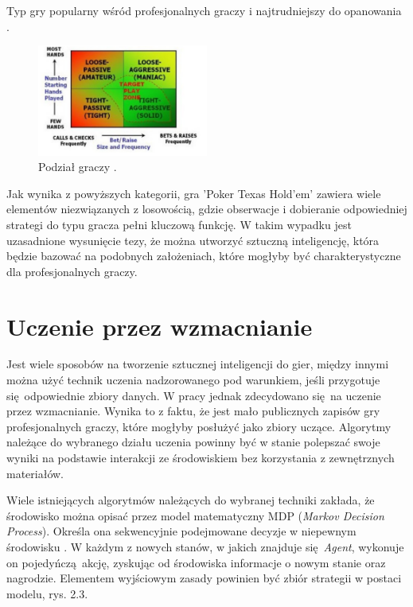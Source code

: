 \documentclass[12pt,oneside,a4paper]{report}
\begin{document}
Typ gry popularny wśród profesjonalnych graczy i najtrudniejszy do opanowania \cite{class}.




\begin{figure}[h!]
            \center
           \includegraphics[width=0.5\textwidth]{./img/class.pdf}
           \caption{Podział graczy \cite{class}.}
\end{figure}


Jak wynika z powyższych kategorii, gra 'Poker Texas Hold'em' zawiera wiele elementów niezwiązanych z
losowością, gdzie obserwacje i dobieranie odpowiedniej strategi do typu gracza pełni kluczową
funkcję. W takim
wypadku jest uzasadnione wysunięcie tezy, że można utworzyć sztuczną inteligencję,
która będzie bazować na podobnych założeniach, które mogłyby być charakterystyczne
dla profesjonalnych graczy.

\section{Uczenie przez wzmacnianie}

Jest wiele sposobów na tworzenie sztucznej inteligencji do gier, między innymi można użyć technik uczenia
nadzorowanego pod warunkiem, jeśli przygotuje się odpowiednie zbiory danych. W pracy jednak
zdecydowano się na uczenie przez wzmacnianie. Wynika to z faktu, że jest mało publicznych zapisów
gry profesjonalnych graczy, które mogłyby posłużyć jako zbiory uczące.
Algorytmy należące do
wybranego działu uczenia powinny być w stanie polepszać swoje wyniki na podstawie interakcji ze
środowiskiem bez korzystania z zewnętrznych materiałów.  


Wiele istniejących algorytmów należących do wybranej techniki zakłada, że środowisko można opisać
przez model
matematyczny
MDP (\emph{Markov Decision Process}). 
Określa ona sekwencyjnie podejmowane decyzje w niepewnym środowisku \cite{mdp}. W każdym z nowych
stanów, w
jakich znajduje się \emph{Agent}, wykonuje on pojedyńczą akcję, zyskując od środowiska informacje o nowym stanie
oraz nagrodzie. Elementem wyjściowym zasady powinien być
zbiór strategii w postaci modelu, rys. 2.3.
\end{document}
